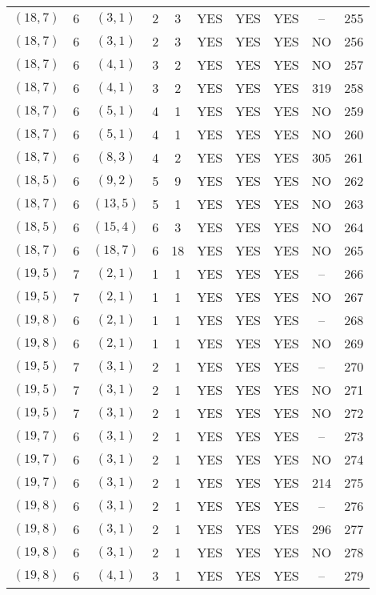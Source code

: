 \begin{longtable}{|c|c|c|c|c|c|c|c|c|c|}
$(18, 7)$ & 6 & $(3, 1)$ & 2 & 3 & YES & YES & YES & -- & 255\\
$(18, 7)$ & 6 & $(3, 1)$ & 2 & 3 & YES & YES & YES & NO & 256\\
$(18, 7)$ & 6 & $(4, 1)$ & 3 & 2 & YES & YES & YES & NO & 257\\
$(18, 7)$ & 6 & $(4, 1)$ & 3 & 2 & YES & YES & YES & 319 & 258\\
$(18, 7)$ & 6 & $(5, 1)$ & 4 & 1 & YES & YES & YES & NO & 259\\
$(18, 7)$ & 6 & $(5, 1)$ & 4 & 1 & YES & YES & YES & NO & 260\\
$(18, 7)$ & 6 & $(8, 3)$ & 4 & 2 & YES & YES & YES & 305 & 261\\
$(18, 5)$ & 6 & $(9, 2)$ & 5 & 9 & YES & YES & YES & NO & 262\\
$(18, 7)$ & 6 & $(13, 5)$ & 5 & 1 & YES & YES & YES & NO & 263\\
$(18, 5)$ & 6 & $(15, 4)$ & 6 & 3 & YES & YES & YES & NO & 264\\
$(18, 7)$ & 6 & $(18, 7)$ & 6 & 18 & YES & YES & YES & NO & 265\\
$(19, 5)$ & 7 & $(2, 1)$ & 1 & 1 & YES & YES & YES & -- & 266\\
$(19, 5)$ & 7 & $(2, 1)$ & 1 & 1 & YES & YES & YES & NO & 267\\
$(19, 8)$ & 6 & $(2, 1)$ & 1 & 1 & YES & YES & YES & -- & 268\\
$(19, 8)$ & 6 & $(2, 1)$ & 1 & 1 & YES & YES & YES & NO & 269\\
$(19, 5)$ & 7 & $(3, 1)$ & 2 & 1 & YES & YES & YES & -- & 270\\
$(19, 5)$ & 7 & $(3, 1)$ & 2 & 1 & YES & YES & YES & NO & 271\\
$(19, 5)$ & 7 & $(3, 1)$ & 2 & 1 & YES & YES & YES & NO & 272\\
$(19, 7)$ & 6 & $(3, 1)$ & 2 & 1 & YES & YES & YES & -- & 273\\
$(19, 7)$ & 6 & $(3, 1)$ & 2 & 1 & YES & YES & YES & NO & 274\\
$(19, 7)$ & 6 & $(3, 1)$ & 2 & 1 & YES & YES & YES & 214 & 275\\
$(19, 8)$ & 6 & $(3, 1)$ & 2 & 1 & YES & YES & YES & -- & 276\\
$(19, 8)$ & 6 & $(3, 1)$ & 2 & 1 & YES & YES & YES & 296 & 277\\
$(19, 8)$ & 6 & $(3, 1)$ & 2 & 1 & YES & YES & YES & NO & 278\\
$(19, 8)$ & 6 & $(4, 1)$ & 3 & 1 & YES & YES & YES & -- & 279\\

\end{longtable}
